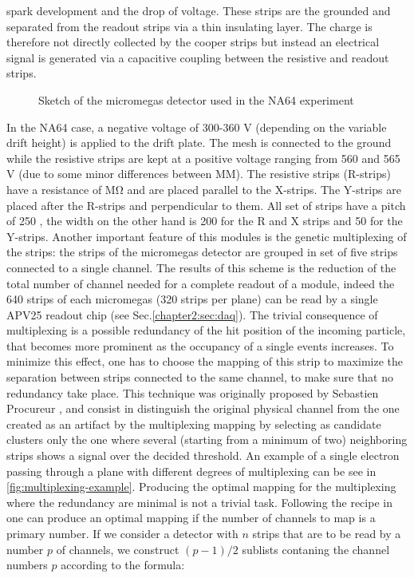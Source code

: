 spark development and the drop of voltage. These strips are the grounded and separated from the readout strips via a thin insulating layer. The charge is therefore not directly collected by the cooper strips but instead an electrical signal is generated via a capacitive coupling between the resistive and readout strips.

\begin{figure}[bth!]
  \centering
  
  \caption[Micromegas sketch]{Sketch of the micromegas detector used in the NA64 experiment}
  \label{fig:mm-sketch}
\end{figure}

In the NA64 case, a negative voltage of 300-360 \si{\volt} (depending on the variable drift height) is applied to the drift plate. The mesh is connected to the ground while the resistive strips are kept at a positive voltage ranging from 560 and 565 \si{\volt} (due to some minor differences between MM). The resistive strips (R-strips) have a resistance of \si{\mega\ohm} and are placed parallel to the X-strips. The Y-strips are placed after the R-strips and perpendicular to them. All set of strips have a pitch of 250 \mum, the width on the other hand is 200 \mum for the R and X strips and 50 \mum for the Y-strips.
Another important feature of this modules is the genetic multiplexing of the strips: the strips of the micromegas detector are grouped in set of five strips connected to a single channel. The results of this scheme is the reduction of the total number of channel needed for a complete readout of a module, indeed the 640 strips of each micromegas (320 strips per plane) can be read by a single APV25 readout chip (see Sec.\ref{chapter2:sec:daq}). The trivial consequence of multiplexing is a possible redundancy of the hit position of the incoming particle, that becomes more prominent as the occupancy of a single events increases. To minimize this effect, one has to choose the mapping of this strip to maximize the separation between strips connected to the same channel, to make sure that no redundancy take place. This technique was originally proposed by Sebastien Procureur \cite{Procureur:2013yea}, and consist in distinguish the original physical channel from the one created as an artifact by the multiplexing mapping by selecting as candidate clusters only the one where several (starting from a minimum of two) neighboring strips shows a signal over the decided threshold. An example of a single electron passing through a plane with different degrees of multiplexing can be see in \ref{fig:multiplexing-example}. Producing the optimal mapping for the multiplexing where the redundancy are minimal is not a trivial task. Following the recipe in \cite{Procureur:2013yea} one can produce an optimal mapping if the number of channels to map is a primary number. If we consider a detector with $n$ strips that are to be read by a number $p$ of channels, we construct $(p-1)/2$ sublists contaning the channel numbers $p$ according to the formula:

